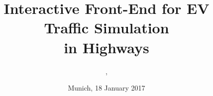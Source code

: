 %
% 
% 
%







\newcommand{\Datum}{\today}

\renewcommand{\PraesentationFusszeileZusatz}{\PersonNameA, \PersonNameB\;| Interactive Front-End for
EV Traffic Simulation in Highways}

\title{Interactive Front-End for EV Traffic Simulation \vspace{5mm} \\ in Highways}
\author{\PersonNameA, \PersonNameB}
\institute[]{\UniversitaetName \\ \FakultaetName \\ \LehrstuhlName}
\date[\Datum]{Munich, 18 January 2017}
\subject{Interactive Front-End for EV Traffic Simulation in Highways}




\PraesentationMasterKopfzeileDreizeiler

\PraesentationTitelseite






